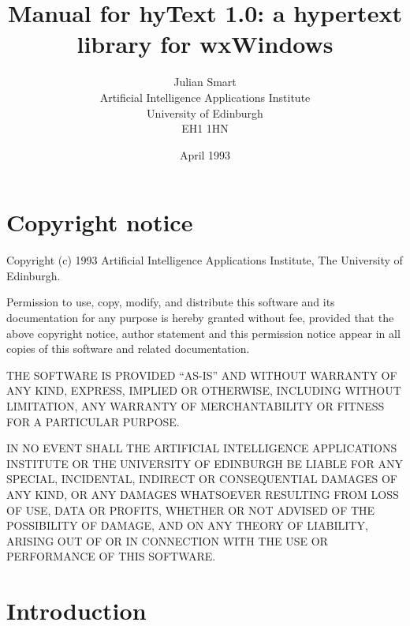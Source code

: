 
\parskip=10pt%
\title{Manual for hyText 1.0: a hypertext library for wxWindows}
\author{Julian Smart\\Artificial Intelligence Applications Institute\\
University of Edinburgh\\EH1 1HN}
\date{April 1993}%
\makeindex%
%
%
\maketitle
%
\pagestyle{fancyplain}
\setfooter{\thepage}{}{}{}{}{\thepage}
\tableofcontents%
%
\chapter*{Copyright notice}
%
\setfooter{\thepage}{}{}{}{}{\thepage}

Copyright (c) 1993 Artificial Intelligence Applications Institute,
The University of Edinburgh.

Permission to use, copy, modify, and distribute this software and its
documentation for any purpose is hereby granted without fee, provided that the
above copyright notice, author statement and this permission notice appear in
all copies of this software and related documentation.

THE SOFTWARE IS PROVIDED ``AS-IS'' AND WITHOUT WARRANTY OF ANY KIND, EXPRESS,
IMPLIED OR OTHERWISE, INCLUDING WITHOUT LIMITATION, ANY WARRANTY OF
MERCHANTABILITY OR FITNESS FOR A PARTICULAR PURPOSE.

IN NO EVENT SHALL THE ARTIFICIAL INTELLIGENCE APPLICATIONS INSTITUTE OR THE
UNIVERSITY OF EDINBURGH BE LIABLE FOR ANY SPECIAL, INCIDENTAL, INDIRECT OR
CONSEQUENTIAL DAMAGES OF ANY KIND, OR ANY DAMAGES WHATSOEVER RESULTING FROM
LOSS OF USE, DATA OR PROFITS, WHETHER OR NOT ADVISED OF THE POSSIBILITY OF
DAMAGE, AND ON ANY THEORY OF LIABILITY, ARISING OUT OF OR IN CONNECTION WITH
THE USE OR PERFORMANCE OF THIS SOFTWARE.

\chapter{Introduction}
%
%
\setfooter{\thepage}{}{}{}{}{\thepage}

